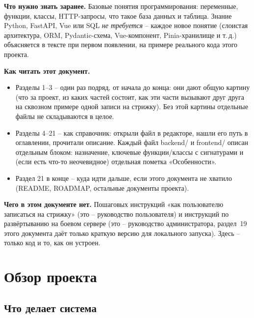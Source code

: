 \textbf{Что нужно знать заранее.} Базовые понятия программирования:
переменные, функции, классы, HTTP-запросы, что такое база данных и таблица.
Знание Python, FastAPI, Vue или SQL \emph{не требуется} -- каждое новое
понятие (слоистая архитектура, ORM, Pydantic-схема, Vue-компонент,
Pinia-хранилище и т.\,д.) объясняется в тексте при первом появлении, на
примере реального кода этого проекта.

\textbf{Как читать этот документ.}

\begin{itemize}
  \item Разделы 1--3 -- один раз подряд, от начала до конца: они дают
        общую картину (что за проект, из каких частей состоит, как эти
        части вызывают друг друга на сквозном примере одной записи на
        стрижку). Без этой картины отдельные файлы не складываются в
        целое.
  \item Разделы 4--21 -- как справочник: открыли файл в редакторе,
        нашли его путь в оглавлении, прочитали описание. Каждый файл
        backend/ и frontend/ описан отдельным блоком: назначение,
        ключевые функции/классы с сигнатурами и (если есть что-то
        неочевидное) отдельная пометка «Особенности».
  \item Раздел 21 в конце -- куда идти дальше, если этого документа
        не хватило (README, ROADMAP, остальные документы проекта).
\end{itemize}

\textbf{Чего в этом документе нет.} Пошаговых инструкций «как
пользователю записаться на стрижку» (это -- руководство пользователя) и
инструкций по развёртыванию на боевом сервере (это -- руководство
администратора, раздел~19 этого документа даёт только краткую версию для
локального запуска). Здесь -- только код и то, как он устроен.

\newpage
\tableofcontents
\newpage

\section{Обзор проекта}

\subsection*{Что делает система}

